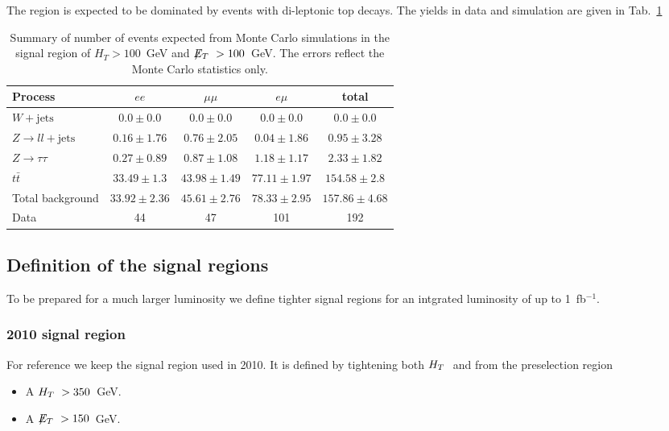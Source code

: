 The region is expected to be dominated by events with di-leptonic
top decays. The yields in data and simulation are given in
Tab.~\ref{tab:presel}

\begin{table}[htb]
\begin{center}
\caption{\label{tab:presel}\protect Summary of number of events expected from Monte Carlo simulations in 
the signal region of $H_T> 100$~GeV and $\displaystyle{\not} E_T~> 100$~GeV. The errors reflect the Monte Carlo statistics only.}
\begin{tabular}{l|ccc|c}
\hline
Process           & $ee$       & $\mu\mu$     & $e\mu$   & total   \\
\hline\hline
$W+\textrm{jets}$ &$0.0 \pm 0.0$&$0.0 \pm 0.0$&$0.0 \pm 0.0$&$0.0 \pm 0.0$\\
$Z\rightarrow ll+\textrm{jets}$&$0.16 \pm 1.76$&$0.76 \pm 2.05$&$0.04 \pm 1.86$&$0.95 \pm 3.28$\\
$Z \rightarrow \tau\tau$&$0.27 \pm 0.89$&$0.87 \pm 1.08$&$1.18 \pm 1.17$&$2.33 \pm 1.82$\\
$t\bar{t}$&$33.49 \pm 1.3$&$43.98 \pm 1.49$&$77.11 \pm 1.97$&$154.58 \pm 2.8$\\
\hline
Total background&$33.92 \pm 2.36$&$45.61 \pm 2.76$&$78.33 \pm 2.95$&$157.86 \pm 4.68$\\\hline
\hline
Data  & 44 & 47 & 101 & 192 \\
\hline\hline
\end{tabular}
\end{center}
\end{table}


\subsection{Definition of the signal regions}

To be prepared for a much larger luminosity we
define tighter signal regions for an
intgrated luminosity of up to 1~fb$^{-1}$.

\subsubsection{2010 signal region}
For reference we keep the signal region used in 2010. It is defined by
tightening both $H_T~$ and \MET from the preselection region
\begin{itemize}
\item A $H_T~>350$~GeV.
\item A $\displaystyle{\not} E_T~>150$~GeV.
\end{itemize}


